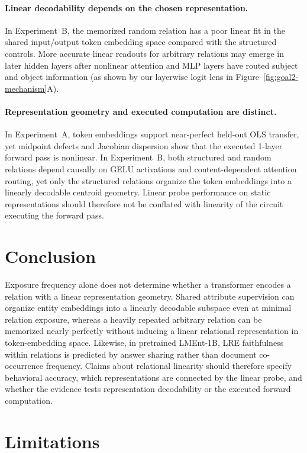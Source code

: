 \documentclass[11pt]{article}
\begin{document}
\paragraph{Linear decodability depends on the chosen representation.}
In Experiment~B, the memorized random relation has a poor linear fit in the
shared input/output token embedding space compared with the structured
controls. More accurate linear readouts for arbitrary relations may emerge in
later hidden layers after nonlinear attention and MLP layers have routed
subject and object information (as shown by our layerwise logit lens in
Figure~\ref{fig:goal2-mechanism}A).

\paragraph{Representation geometry and executed computation are distinct.}
In Experiment~A, token embeddings support near-perfect held-out OLS transfer,
yet midpoint defects and Jacobian dispersion show that the executed 1-layer
forward pass is nonlinear. In Experiment~B, both structured and random relations
depend causally on GELU activations and content-dependent attention routing, yet
only the structured relations organize the token embeddings into a linearly
decodable centroid geometry. Linear probe performance on static representations
should therefore not be conflated with linearity of the circuit executing the
forward pass.

\section{Conclusion}

Exposure frequency alone does not determine whether a transformer encodes a
relation with a linear representation geometry. Shared attribute supervision can
organize entity embeddings into a linearly decodable subspace even at minimal
relation exposure, whereas a heavily repeated arbitrary relation can be
memorized nearly perfectly without inducing a linear relational representation
in token-embedding space. Likewise, in pretrained LMEnt-1B, LRE faithfulness
within relations is predicted by answer sharing rather than document
co-occurrence frequency. Claims about relational linearity should therefore
specify behavioral accuracy, which representations are connected by the linear
probe, and whether the evidence tests representation decodability or the
executed forward computation.

\section*{Limitations}
\end{document}
